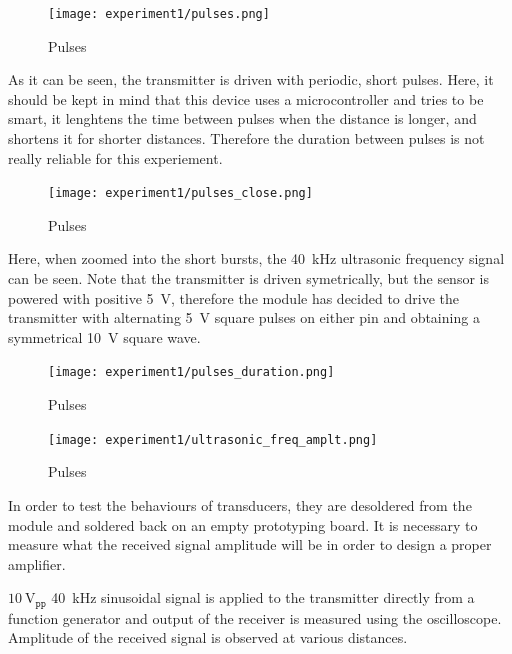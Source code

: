 \documentclass[12pt, a4paper]{article}
\begin{document}
        \begin{figure}[H]\centering
            \texttt{[image: experiment1/pulses.png]}
            \caption[]{Pulses}\label{fig:pulses}
        \end{figure}

        \noindent As it can be seen, the transmitter is driven with periodic, short pulses. Here, it should be kept in mind that this device uses a microcontroller and tries to be smart, it lenghtens the time between pulses when the distance is longer, and shortens it for shorter distances. Therefore the duration between pulses is not really reliable for this experiement. 

        \begin{figure}[H]\centering
            \texttt{[image: experiment1/pulses\_close.png]}
            \caption[]{Pulses}\label{fig:pulses}
        \end{figure}

        \noindent Here, when zoomed into the short bursts, the \SI{40}{\kilo\hertz} ultrasonic frequency signal can be seen. Note that the transmitter is driven symetrically, but the sensor is powered with positive \SI{5}{\volt}, therefore the module has decided to drive the transmitter with alternating \SI{5}{\volt} square pulses on either pin and obtaining a symmetrical \SI{10}{\volt} square wave. 

        \begin{figure}[H]\centering
            \texttt{[image: experiment1/pulses\_duration.png]}
            \caption[]{Pulses}\label{fig:pulses}
        \end{figure}

        \begin{figure}[H]\centering
            \texttt{[image: experiment1/ultrasonic\_freq\_amplt.png]}
            \caption[]{Pulses}\label{fig:pulses}
        \end{figure}



        \pagebreak
        In order to test the behaviours of transducers, they are desoldered from the module and soldered back on an empty prototyping board. It is necessary to measure what the received signal amplitude will be in order to design a proper amplifier.

        $\SI{10}{\volt}_{\texttt{pp}}$ \SI{40}{\kilo\hertz} sinusoidal signal is applied to the transmitter directly from a function generator and output of the receiver is measured using the oscilloscope. Amplitude of the received signal is observed at various distances. 
\end{document}
